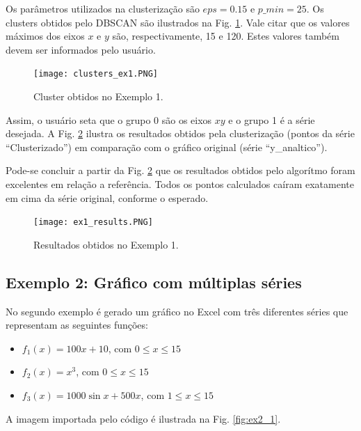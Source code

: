 \documentclass{article}
\begin{document}
    Os parâmetros utilizados na clusterização são $eps=0.15$ e $p\_min=25$. Os clusters obtidos pelo DBSCAN são ilustrados na Fig. \ref{fig:ex1_2}. Vale citar que os valores máximos dos eixos $x$ e $y$ são, respectivamente, 15 e 120. Estes valores também devem ser informados pelo usuário.
    
    \begin{figure}[h]
        \centering
        \texttt{[image: clusters\_ex1.PNG]}
        \caption{Cluster obtidos no Exemplo 1.}
        \label{fig:ex1_2}
    \end{figure}
    
    Assim, o usuário seta que o grupo 0 são os eixos $xy$ e o grupo 1 é a série desejada. A Fig. \ref{fig:ex1_3} ilustra os resultados obtidos pela clusterização (pontos da série ``Clusterizado'') em comparação com o gráfico original (série ``y\_analtico'').
    
    Pode-se concluir a partir da Fig. \ref{fig:ex1_3} que os resultados obtidos pelo algorítmo foram excelentes em relação a referência. Todos os pontos calculados caíram exatamente em cima da série original, conforme o esperado.
    
    \begin{figure}[H]
        \centering
        \texttt{[image: ex1\_results.PNG]}
        \caption{Resultados obtidos no Exemplo 1.}
        \label{fig:ex1_3}
    \end{figure}
    
    \subsection{Exemplo 2: Gráfico com múltiplas séries}    
    
    No segundo exemplo é gerado um gráfico no Excel com três diferentes séries que representam as seguintes funções:
    
    \begin{itemize}
        \item $f_1(x)=100x+10$, com $0\leq x \leq 15$
        \item $f_2(x)=x^3$, com $0\leq x \leq 15$
        \item $f_3(x)=1000\sin{x}+500x$, com $1\leq x \leq 15$
    \end{itemize}
    
    A imagem importada pelo código é ilustrada na Fig. \ref{fig:ex2_1}.
    
\end{document}

